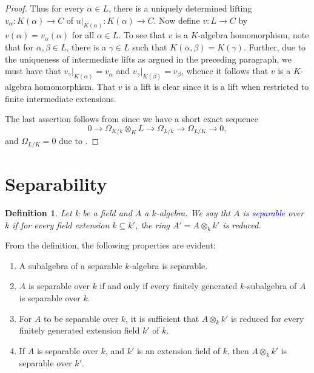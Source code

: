 \documentclass[10pt]{article}
\theoremstyle{thmstyle}
\theoremstyle{defstyle}
\newtheorem{definition}[theorem]{Definition}
\newcommand{\define}[1]{\textcolor{blue}{\textit{#1}}}
\begin{document}
\begin{proof}
    Thus for every $\alpha\in L$, there is a uniquely determined lifting $v_\alpha\colon K(\alpha)\to C$ of $u|_{K(\alpha)}\colon K(\alpha)\to C$. Now define $v\colon L\to C$ by $v(\alpha) = v_\alpha(\alpha)$ for all $\alpha\in L$. To see that $v$ is a $K$-algebra homomorphism, note that for $\alpha,\beta\in L$, there is a $\gamma\in L$ such that $K(\alpha, \beta) = K(\gamma)$. Further, due to the uniqueness of intermediate lifts as argued in the preceding paragraph, we must have that $v_\gamma|_{K(\alpha)} = v_\alpha$ and $v_\gamma|_{K(\beta)} = v_\beta$, whence it follows that $v$ is a $K$-algebra homomorphism. That $v$ is a lift is clear since it is a lift when restricted to finite intermediate extensions.

    The last assertion follows from  since we have a short exact sequence 
    \begin{equation*}
        0\to\Omega_{K/k}\otimes_K L\to\Omega_{L/k}\to\Omega_{L/K}\to 0,
    \end{equation*}
    and $\Omega_{L/K} = 0$ due to .
\end{proof}

\section{Separability}

\begin{definition}
    Let $k$ be a field and $A$ a $k$-algebra. We say tht $A$ is \define{separable} over $k$ if for every field extension $k\subseteq k'$, the ring $A' = A\otimes_k k'$ is reduced. 
\end{definition}

From the definition, the following properties are evident: 
\begin{enumerate}[label=(\roman*)]
    \item A subalgebra of a separable $k$-algebra is separable. 
    \item $A$ is separable over $k$ if and only if every finitely generated $k$-subalgebra of $A$ is separable over $k$. 
    \item For $A$ to be separable over $k$, it is sufficient that $A\otimes_k k'$ is reduced for every finitely generated extension field $k'$ of $k$.
    \item If $A$ is separable over $k$, and $k'$ is an extension field of $k$, then $A\otimes_k k'$ is separable over $k'$.
\end{enumerate}
\end{document}
